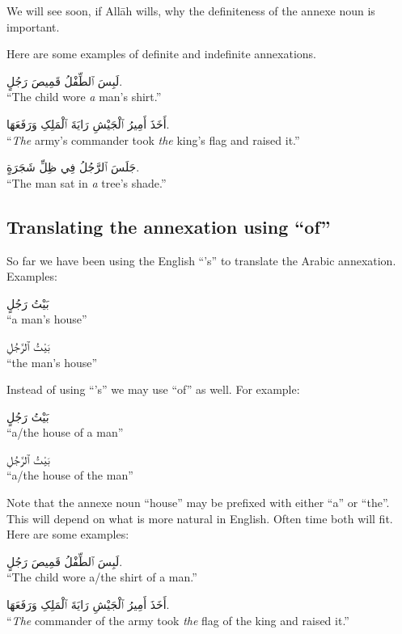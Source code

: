 \documentclass[
  10pt,
]{book}
\begin{document}
We will see soon, if Allāh wills, why the definiteness of the annexe noun is important.

Here are some examples of definite and indefinite annexations.

\foreignlanguage{arabic}{لَبِسَ ٱلطِّفْلُ قَمِيصَ رَجُلٍ.}\\
\enquote{The child wore \emph{a} man's shirt.}

\foreignlanguage{arabic}{أَخَذَ أَمِيرُ ٱلْجَيْشِ رَايَةَ ٱلْمَلِکِ وَرَفَعَهَا.}\\
\enquote{\emph{The} army's commander took \emph{the} king's flag and raised it.}

\foreignlanguage{arabic}{جَلَسَ ٱلرَّجُلُ فِي ظِلِّ شَجَرَةٍ.}\\
\enquote{The man sat in \emph{a} tree's shade.}

\subsection{\texorpdfstring{Translating the annexation using \enquote{of}}{Translating the annexation using ``of''}}\label{translating-the-annexation-using-of}

So far we have been using the English \enquote{'s} to translate the Arabic annexation. Examples:

\foreignlanguage{arabic}{بَيْتُ رَجُلٍ}\\
\enquote{a man's house}

\foreignlanguage{arabic}{بَيْتُ ٱلرَّجُلِ}\\
\enquote{the man's house}

Instead of using \enquote{'s} we may use \enquote{of} as well. For example:

\foreignlanguage{arabic}{بَيْتُ رَجُلٍ}\\
\enquote{a/the house of a man}

\foreignlanguage{arabic}{بَيْتُ ٱلرَّجُلِ}\\
\enquote{a/the house of the man}

Note that the annexe noun \enquote{house} may be prefixed with either \enquote{a} or \enquote{the}. This will depend on what is more natural in English. Often time both will fit. Here are some examples:

\foreignlanguage{arabic}{لَبِسَ ٱلطِّفْلُ قَمِيصَ رَجُلٍ.}\\
\enquote{The child wore a/the shirt of a man.}

\foreignlanguage{arabic}{أَخَذَ أَمِيرُ ٱلْجَيْشِ رَايَةَ ٱلْمَلِکِ وَرَفَعَهَا.}\\
\enquote{\emph{The} commander of the army took \emph{the} flag of the king and raised it.}
\end{document}
